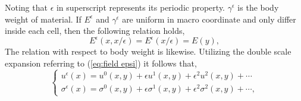\documentclass[10pt,a4paper]{scrreprt}
\begin{document}
Noting that $\epsilon$ in superscript represents its periodic property. $\gamma^{\epsilon}$ is the body weight of material. If $E^{\epsilon}$ and $\gamma^{\epsilon}$ are uniform in macro coordinate and only differ inside each cell, then the following relation holds,
\begin{equation}
E^{\epsilon}(x,x/\epsilon)=E^{\epsilon}(x/\epsilon)=E(y),
\end{equation}
The relation with respect to body weight is likewise. Utilizing the double scale expansion referring to (\ref{eq:field epsi}) it follows that,
\begin{equation}
\left\{
\begin{array}{l}
u^{\epsilon}(x) = u^{0}(x,y) + \epsilon u^{1}(x,y) + \epsilon^{2} u^{2}(x,y) + \cdots \\
\sigma^{\epsilon}(x) = \sigma^{0}(x,y) + \epsilon \sigma^{1}(x,y) + \epsilon^{2} \sigma^{2}(x,y) + \cdots,
\end{array}
\right.
\end{equation}
\end{document}
